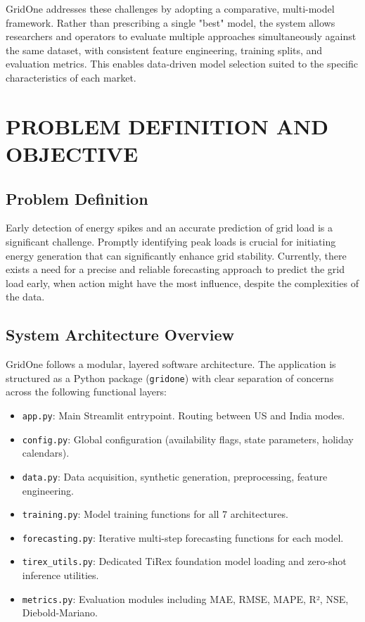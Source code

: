 \documentclass[ 12pt,a4paper,twocolumn,fleqn]{report}
\begin{document}
GridOne addresses these challenges by adopting a comparative, multi-model framework. Rather than prescribing a single "best" model, the system allows researchers and operators to evaluate multiple approaches simultaneously against the same dataset, with consistent feature engineering, training splits, and evaluation metrics. This enables data-driven model selection suited to the specific characteristics of each market.

\newpage
  \pagestyle{fancy}
\thisfancypage{%
  \setlength{\fboxsep}{20pt}\doublebox}{}
\normalsize
\chapter{PROBLEM DEFINITION AND OBJECTIVE}
\section{Problem Definition}
\vspace{2mm}
Early detection of energy spikes and an accurate prediction of grid load is a significant challenge. Promptly identifying peak loads is crucial for initiating energy generation that can significantly enhance grid stability. Currently, there exists a need for a precise and reliable forecasting approach to predict the grid load early, when action might have the most influence, despite the complexities of the data.

\section{System Architecture Overview}
\vspace{2mm}
GridOne follows a modular, layered software architecture. The application is structured as a Python package (\texttt{gridone}) with clear separation of concerns across the following functional layers:
\begin{itemize}
    \item \texttt{app.py}: Main Streamlit entrypoint. Routing between US and India modes.
    \item \texttt{config.py}: Global configuration (availability flags, state parameters, holiday calendars).
    \item \texttt{data.py}: Data acquisition, synthetic generation, preprocessing, feature engineering.
    \item \texttt{training.py}: Model training functions for all 7 architectures.
    \item \texttt{forecasting.py}: Iterative multi-step forecasting functions for each model.
    \item \texttt{tirex\_utils.py}: Dedicated TiRex foundation model loading and zero-shot inference utilities.
    \item \texttt{metrics.py}: Evaluation modules including MAE, RMSE, MAPE, R², NSE, Diebold-Mariano.
\end{itemize}
\end{document}
